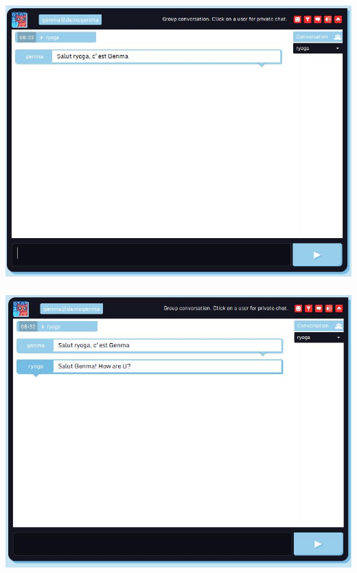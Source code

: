 \documentclass{beamer}
\begin{document}
\begin{frame}
\frametitle{}
\begin{center}
\includegraphics[scale=0.5] {./images/Cryptocat06.jpg} 
\end{center}
\end{frame}

\begin{frame}
\frametitle{}
\begin{center}
\includegraphics[scale=0.5] {./images/Cryptocat07.jpg} 
\end{center}
\end{frame}
\end{document}
